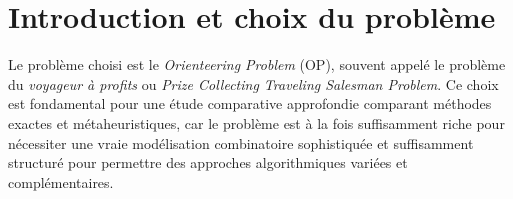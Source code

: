\documentclass[11pt,a4paper]{article}
\begin{document}
\vspace*{\fill}

\begin{center}
\begin{minipage}{1\textwidth}

\begin{abstract}

Ce rapport présente une étude complète du \emph{Orienteering Problem} (OP), problème de routage avec profits soumis à une contrainte de budget. L'objectif est de sélectionner et d'ordonner un sous-ensemble de sommets afin de maximiser le profit total tout en respectant une borne de coût.

Le travail combine une modélisation mathématique rigoureuse, trois méthodes exactes distinctes, trois métaheuristiques adaptées, puis une comparaison expérimentale sur plusieurs instances. L'ensemble est analysé dans une perspective scientifique, en mettant l'accent sur la structure combinatoire du problème, les choix algorithmiques et l'interprétation critique des résultats.

Une attention particulière est également portée à la visualisation des solutions et à l'analyse comparative des comportements algorithmiques afin de mieux comprendre les mécanismes internes de recherche.

\end{abstract}

\end{minipage}
\end{center}

\vspace*{\fill}

\vspace{0.4cm}

\newpage

\tableofcontents

\newpage


\section{Introduction et choix du problème}

Le problème choisi est le \emph{Orienteering Problem} (OP), souvent appelé le problème du \emph{voyageur à profits} ou \emph{Prize Collecting Traveling Salesman Problem}. Ce choix est fondamental pour une étude comparative approfondie comparant méthodes exactes et métaheuristiques, car le problème est à la fois suffisamment riche pour nécessiter une vraie modélisation combinatoire sophistiquée et suffisamment structuré pour permettre des approches algorithmiques variées et complémentaires.
\end{document}
